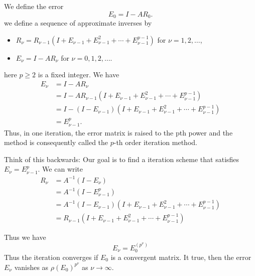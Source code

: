 \documentclass[../main.tex]{subfiles}
\begin{document}
We define the error
\begin{equation*}
	E_0 = I - A R_0.
\end{equation*}
we define a sequence of approximate inverses by
\begin{itemize}
	\item $R_{\nu} = R_{\nu-1}(I + E_{\nu-1} + E_{\nu-1}^2 + \cdots + E_{\nu-1}^{p-1})$ for $\nu = 1, 2, \ldots$,
	\item $E_{\nu} = I - A R_{\nu}$ for $\nu = 0, 1, 2, \ldots$.
\end{itemize}
here $p \geq 2$ is a fixed integer. We have
\begin{equation*}
	\begin{aligned}
		E_{\nu} & = I - A R_{\nu}                                                                \\
		        & = I - A R_{\nu-1} (I + E_{\nu-1} + E_{\nu-1}^2 + \cdots + E_{\nu-1}^{p-1})     \\
		        & = I - (I - E_{\nu-1}) (I + E_{\nu-1} + E_{\nu-1}^2 + \cdots + E_{\nu-1}^{p-1}) \\
		        & = E_{\nu-1}^p.
	\end{aligned}
\end{equation*}
Thus, in one iteration, the error matrix is raised to the pth power and the method is consequently called the $p$-th order iteration method.
\begin{remark}
	Think of this backwards: Our goal is to find a iteration scheme that satisfies $E_{\nu} = E_{\nu-1}^p$. We can write
	\begin{equation*}
		\begin{aligned}
			R_{\nu} & = A^{-1} (I - E_{\nu})                                                           \\
			        & = A^{-1} (I - E_{\nu-1}^p)                                                       \\
			        & = A^{-1} (I - E_{\nu-1})(I + E_{\nu-1} + E_{\nu-1}^2 + \cdots + E_{\nu-1}^{p-1}) \\
			        & = R_{\nu-1} (I + E_{\nu-1} + E_{\nu-1}^2 + \cdots + E_{\nu-1}^{p-1})
		\end{aligned}
	\end{equation*}
\end{remark}

Thus we have
\begin{equation}
	E_{\nu} = E_0^{(p^{\nu})}
\end{equation}
Thus the iteration converges if $E_0$ is a convergent matrix. It true, then the error $E_{\nu}$ vanishes as $\rho(E_0)^{p^{\nu}}$ as $\nu \to \infty$.
\end{document}
